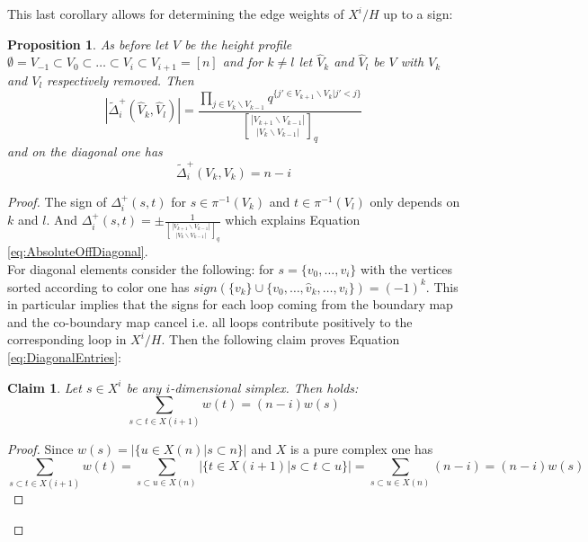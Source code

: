 \documentclass[11pt]{amsart}
\newtheorem{claim}{Claim}
\newtheorem{proposition}[theorem]{Proposition}
\newcommand{\gBinom}{\genfrac{[}{]}{0pt}{}}
\begin{document}
    This last corollary allows for determining the edge weights of $X^i/H$ up to a sign:
    \begin{proposition}
            As before let $V$ be the height profile $\emptyset=V_{-1}\subset V_0\subset\dots\subset V_i\subset V_{i+1}=[n]$  and for $k\neq l$ let $\hat{V}_k$ and $\hat{V}_l$ be $V$ with $V_k$ and $V_l$ respectively removed. Then 
            \begin{equation}
                |\tilde{\Delta}_i^+(\hat{V}_k,\hat{V}_l)|=\frac{\prod_{j\in V_k\backslash V_{k-1}}q^{\{j'\in V_{k+1}\backslash V_k|j'<j\}}}{\gBinom{|V_{k+1}\backslash V_{k-1}|}{|V_{k}\backslash V_{k-1}|}_q}
                \label{eq:AbsoluteOffDiagonal}
            \end{equation}
            and on the diagonal one has 
            \begin{equation}
                \tilde{\Delta}_i^+(V_k,V_k)=n-i
                \label{eq:DiagonalEntries}
            \end{equation}
    \end{proposition}
    \label{prop:AbsoluteEntries}
    \begin{proof}
        The sign of $\Delta_i^+(s,t)$ for $s\in\pi^{-1} (V_k)$ and $t\in\pi^{-1}(V_l)$ only depends on $k$ and $l$. And $\Delta_i^+(s,t)=\pm \frac{1}{\gBinom{|V_{k+1}\backslash V_{k-1}|}{|V_{k}\backslash V_{k-1}|}_q}$ which explains Equation \ref{eq:AbsoluteOffDiagonal}.\\
        For diagonal elements consider the following: for $s=\{v_0,\dots,v_i\}$ with the vertices sorted according to color one has $sign(\{v_k\}\cup\{v_0,\dots,\hat{v}_k,\dots, v_i\})=(-1)^k$. This in particular implies that the signs for each loop coming from the boundary map and the co-boundary map cancel i.e. all loops contribute positively to the corresponding loop in $X^i/H$. Then the following claim proves Equation \ref{eq:DiagonalEntries}:
        \begin{claim}
            Let $s\in X^i$ be any $i$-dimensional simplex. Then holds:
            \begin{equation}
                \sum_{s\subset t\in  X(i+1)}w(t)=(n-i)w(s)
            \end{equation}
        \end{claim}
        \begin{proof}
            Since $w(s)=|\{u\in X(n)|s\subset n\}|$ and $X$ is a pure complex one has
            \begin{equation}
                \sum_{s\subset t\in  X(i+1)}w(t)=\sum_{s\subset u\in X(n)}|\{t\in X(i+1)|s\subset t\subset u\}|=\sum_{s\subset u\in X(n)}(n-i)=(n-i)w(s)
            \end{equation}
        \end{proof}
    \end{proof}
\end{document}
